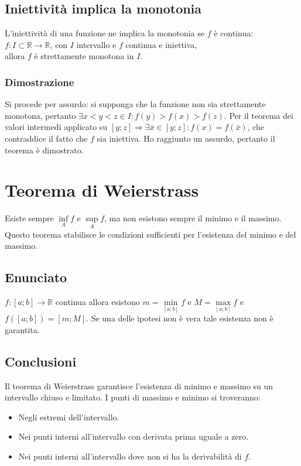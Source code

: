 \subsection{Iniettivit\`a implica la monotonia}
L'iniettivit\`a di una funzione ne implica la monotonia se $f$ \`e continua: $f:I\subset\mathbb{R}\rightarrow\mathbb{R}$, con $I$ intervallo e $f$ continua e iniettiva, \\
allora $f$ \`e strettamente monotona in $I$.
\subsubsection{Dimostrazione}
Si procede per assurdo: si supponga che la funzione non sia strettamente monotona, pertanto $\exists x<y<z\in I:f(y)>f(x)>f(z)$. Per il teorema dei valori intermedi applicato
su $[y;z]\Rightarrow\exists\bar{x}\in[y;z]:f(x)=f(\bar{x})$, che contraddice il fatto che $f$ sia iniettiva. Ho raggiunto un assurdo, pertanto il teorema \`e dimostrato.
\section{Teorema di Weierstrass}
Esiste sempre $\inf\limits_A f$ e $\sup\limits_A f$, ma non esistono sempre il minimo e il massimo. Questo teorema stabilisce le condizioni sufficienti per l'esistenza del 
minimo e del massimo.
\subsection{Enunciato}
$f:[a;b]\rightarrow\mathbb{R}$ continua allora esistono $m=\min\limits_{[a;b]} f$ e $M=\max\limits_{[a;b]} f$ e $f([a;b])=[m;M]$. Se una delle ipotesi non \`e vera tale 
esistenza non \`e garantita. 
\subsection{Conclusioni}
Il teorema di Weierstrass garantisce l'esistenza di minimo e massimo su un intervallo chiuso e limitato. I punti di massimo e minimo si troveranno:
\begin{itemize}
\item Negli estremi dell'intervallo.
\item Nei punti interni all'intervallo con derivata prima uguale a zero.
\item Nei punti interni all'intervallo dove non si ha la derivabilit\`a di $f$.
\end{itemize}